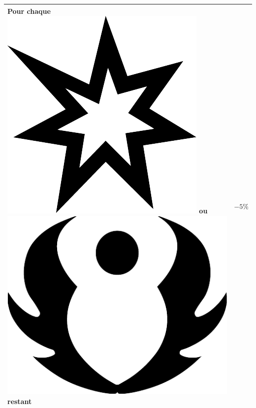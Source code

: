 \documentclass{article}
\begin{document}
\begin{multicols}{2}
\begin{tabular}[b]{|p{5cm}|p{1cm}|}
		Pour chaque {\Large \includegraphics[height=\fontcharht\font`\B]{../img/result_succes_success}} ou {\Large \includegraphics[height=\fontcharht\font`\B]{../img/result_avantage_advantage}} restant & $-5\%$ \\ 
		\hline 

\end{tabular}
\end{multicols}
\end{document}
